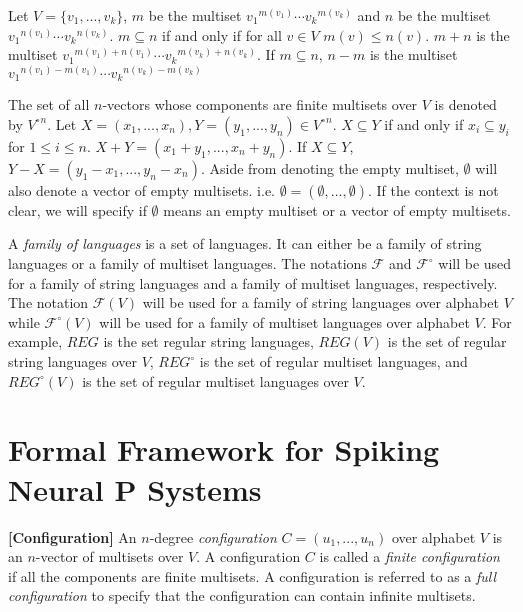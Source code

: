 \documentclass[a4paper]{article}
\theoremstyle{definition}
\begin{document}
Let $V=\{v_1,...,v_k\}$, $m$ be the multiset ${v_1}^{m(v_1)}\cdots{v_k}^{m(v_k)}$ and $n$ be the  
multiset ${v_1}^{n(v_1)}\cdots{v_k}^{n(v_k)}$. $m \subseteq n$ if and only if for all $v \in V$ 
$m(v) \leq n(v)$. $m+n$ is the multiset ${v_1}^{m(v_1)+n(v_1)}\cdots {v_k}^{m(v_k)+n(v_k)}$. If 
$m \subseteq n$, $n-m$ is the multiset ${v_1}^{n(v_1)-m(v_1)}\cdots {v_k}^{n(v_k)-m(v_k)}$

The set of all $n$-vectors whose components are finite multisets over $V$ is denoted by
${V^{\circ}}^{n}$. Let $X=(x_1,...,x_n), Y=(y_1,...,y_n) \in {V^{\circ}}^n$. $X \subseteq Y$ if and
only if $x_i \subseteq y_i$ for $1 \leq i \leq n$. $X+Y = (x_1 + y_1,...,x_n + y_n)$. If 
$X \subseteq Y$, $Y-X = (y_1-x_1,...,y_n-x_n)$. Aside from denoting the empty multiset, $\emptyset$
will also denote a vector of empty multisets. i.e. $\emptyset = (\emptyset,...,\emptyset)$. If the
context is not clear, we will specify if $\emptyset$ means an empty multiset or a vector of empty
multisets.  

A \emph{family of languages} is a set of languages. It can either be a family of string languages or 
a family of multiset languages. The notations $\mathscr{F}$ and $\mathscr{F}^{\circ}$ will be used
for a family of string languages and a family of multiset languages, respectively. The notation
$\mathscr{F}(V)$ will be used for a family of string languages over alphabet $V$ while 
$\mathscr{F}^{\circ}(V)$ will be used for a family of multiset languages over alphabet $V$. For
example, $REG$ is the set regular string languages, $REG(V)$ is the set of regular string 
languages over $V$, $REG^{\circ}$ is the set of regular multiset languages, and $REG^{\circ}(V)$ 
is the set of regular multiset languages over $V$.


\section{Formal Framework for Spiking Neural P Systems}

\cite{freund-2007-ff-1}
\cite{freund-2013-ff-2}
\cite{verlan-2014-ff-2.5}
\cite{verlan-2020-ff-3}


\label{def-conf} \textbf{[Configuration]} An $n$-degree \emph{configuration} 
$C = (u_1,...,u_n)$ over alphabet $V$ is an $n$-vector of multisets over $V$. A configuration $C$ is 
called a \emph{finite configuration} if all the components are finite multisets. A configuration is 
referred to as a \emph{full configuration} to specify that the configuration can contain infinite 
multisets.
\end{document}
